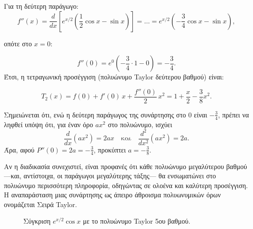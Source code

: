 \documentclass[a4paper, 11pt]{article}
\begin{document}
Για τη δεύτερη παράγωγο: \[
f''(x) = \frac{d}{dx} \left[ e^{x/2} \left( \frac{1}{2}\cos x - \sin x \right) \right] 
= \dots 
= e^{x/2} \left( -\frac{3}{4}\cos x - \sin x \right),
\]

οπότε στο \(x=0\):

\[
f''(0) = e^{0} \left( -\frac{3}{4} \cdot 1 - 0 \right) = -\frac{3}{4}.
\] Έτσι, η τετραγωνική προσέγγιση (πολυώνυμο Taylor δεύτερου βαθμού)
είναι:

\[
\boxed{T_2(x) = f(0) + f'(0)\,x + \frac{f''(0)}{2}\,x^2 = 1 + \frac{x}{2} - \frac{3}{8}x^2}.
\]

Σημειώνεται ότι, ενώ η δεύτερη παράγωγος της συνάρτησης στο \(0\) είναι
\(-\frac{3}{4}\), πρέπει να ληφθεί υπόψη ότι, για έναν όρο \(a x^2\) στο
πολυώνυμο, ισχύει \[
\frac{d}{dx}(a x^2)=2ax \quad \text{και} \quad \frac{d^2}{dx^2}(a x^2)=2a.
\] Άρα, αφού \(P''(0)=2a=-\frac{3}{4}\), προκύπτει \(a=-\frac{3}{8}\).

Αν η διαδικασία συνεχιστεί, είναι προφανές ότι κάθε πολυώνυμο
μεγαλύτερου βαθμού ---και, αντίστοιχα, οι παράγωγοι μεγαλύτερης τάξης---
θα ενσωματώνει στο πολυώνυμο περισσότερη πληροφορία, οδηγώντας σε ολοένα
και καλύτερη προσέγγιση. Η αναπαράσταση μιας συνάρτησης ως άπειρο
άθροισμα πολυωνυμικών όρων ονομάζεται Σειρά Taylor.

\begin{figure}[htbp]
\centering
{}
\caption{Σύγκριση $e^{x/2}\cos x$ με το πολυώνυμο Taylor 5ου βαθμού.}
\label{fig:expcostaylor}
\par
\end{figure}
\end{document}
